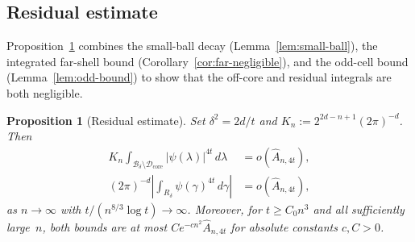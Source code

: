 \documentclass[11pt]{article}
\newtheorem{proposition}[theorem]{Proposition}
\theoremstyle{definition}
\newcommand{\Bbox}{\mathcal{B}}
\newcommand{\corereg}{\mathcal{D}_\mathrm{core}}
\newcommand{\Ahat}{\hat A_{n,4t}}
\begin{document}
\subsection{Residual estimate}

Proposition~\ref{prop:residual-estimate} combines the small-ball decay (Lemma~\ref{lem:small-ball}), the integrated far-shell bound (Corollary~\ref{cor:far-negligible}), and the odd-cell bound (Lemma~\ref{lem:odd-bound}) to show that the off-core and residual integrals are both negligible.

\begin{proposition}[Residual estimate]\label{prop:residual-estimate}
Set \(\delta^2=2d/t\) and \(K_n:=2^{2d-n+1}(2\pi)^{-d}\). Then
\[
  \begin{aligned}
    K_n\int_{\Bbox_\delta\setminus\corereg}|\psi(\lambda)|^{4t}\,d\lambda &= o(\Ahat),\\[3pt]
    (2\pi)^{-d}\left|\int_{R_\delta}\psi(\gamma)^{4t}\,d\gamma\right| &= o(\Ahat),
  \end{aligned}
\]
as \(n\to\infty\) with \(t/(n^{8/3}\log t)\to\infty\).
Moreover, for \(t\ge C_0 n^3\) and all sufficiently large~\(n\), both bounds are at most \(Ce^{-cn^2}\Ahat\) for absolute constants \(c,C>0\).
\end{proposition}
\end{document}
